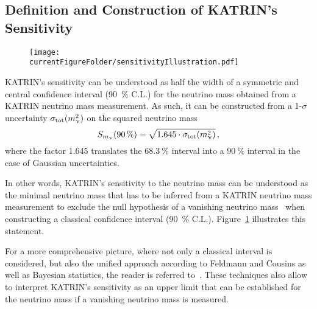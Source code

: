 \subsection{Definition and Construction of KATRIN's Sensitivity}
\label{sec:statMethodsSensitivtyDef}
\begin{figure}
	\centering
	\texttt{[image: \\currentFigureFolder/sensitivityIllustration.pdf]}
	\label{fig:statMethodsSensitivity}
\end{figure}

KATRIN's sensitivity can be understood as half the width of a symmetric and central confidence interval (\SI{90}{\percent} C.L.) for the neutrino mass obtained from a KATRIN neutrino mass measurement. As such, it can be constructed from a 1-$\sigma$ uncertainty $\sigma_\mathrm{tot}(m_\upnu^2)$ on the squared neutrino mass~\cite{Angrik:2005ep}
\begin{equation}
\label{eq:statMethodsSensitivity}
S_{m_\upnu}(\SI{90}{\percent}) = \sqrt{1.645\cdot\sigma_\mathrm{tot}(m_\upnu^2)}
\text{\,,}
\end{equation}
where the factor 1.645 translates the $\SI{68.3}{\percent}$ interval into a $\SI{90}{\percent}$ interval in the case of Gaussian uncertainties.

In other words, KATRIN's sensitivity to the neutrino mass can be understood as the minimal neutrino mass that has to be inferred from a KATRIN neutrino mass measurement to exclude the null hypothesis of a vanishing neutrino mass~\cite{Kleesiek2014} when constructing a classical confidence interval (\SI{90}{\percent} C.L.). Figure~\ref{fig:statMethodsSensitivity} illustrates this statement.

For a more comprehensive picture, where not only a classical interval is considered, but also the unified approach according to Feldmann and Cousins as well as Bayesian statistics, the reader is referred to~\cite{Kleesiek2019}. These techniques also allow to interpret KATRIN's sensitivity as an upper limit that can be established for the neutrino mass if a vanishing neutrino mass is measured.

